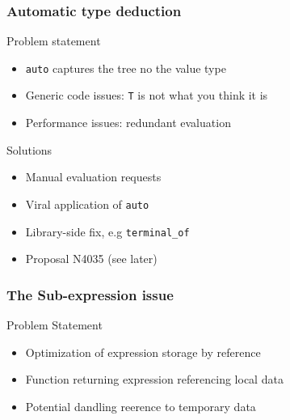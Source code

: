 
{
}

\begin{frame}
\frametitle{Automatic type deduction}
\begin{block}{Problem statement}
\begin{itemize}
\item \texttt{auto} captures the tree no the value type
\item Generic code issues: \texttt{T} is not what you think it is
\item Performance issues: redundant evaluation
\end{itemize}
\end{block}{}
{
\lstautoissue
}

{
\lstgenericissue
}

{
\lstmultieval
}

{
\begin{block}{Solutions}
\begin{itemize}
\item Manual evaluation requests
\item Viral application of \texttt{auto}
\item Library-side fix, e.g \texttt{terminal\_of}
\item Proposal N4035 (see later)
\end{itemize}
\end{block}{}
}

\end{frame}

\begin{frame}
\frametitle{The Sub-expression issue}
\begin{block}{Problem Statement}
\begin{itemize}
\item Optimization of expression storage by reference
\item Function returning expression referencing local data
\item Potential dandling reerence to temporary data
\end{itemize}
\end{block}{}

\lstdang

\end{frame}

